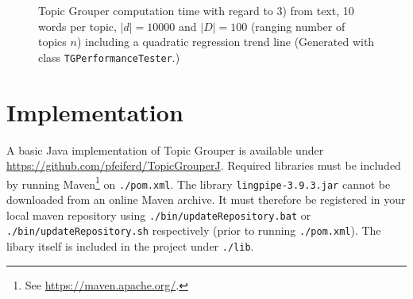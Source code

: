 \documentclass[10pt, a4paper, oneside]{article}
\begin{document}
\begin{figure}
\caption{Topic Grouper computation time with regard to 3) from text, 10 words per topic, $|d| = 10000$ and $|D| = 100$ (ranging number of topics $n$) including a quadratic regression trend line (Generated with class \texttt{TGPerformanceTester}.)}
\label{perf1}
\end{figure}

\section{Implementation}

A basic Java implementation of Topic Grouper is available under\\
\href{https://github.com/pfeiferd/TopicGrouperJ}{https://github.com/pfeiferd/TopicGrouperJ}.
Required libraries must be included by running Maven\footnote{See \href{https://maven.apache.org/}{https://maven.apache.org/}.} on \texttt{./pom.xml}. The library \texttt{lingpipe-3.9.3.jar} cannot be downloaded from an online Maven archive. It must therefore be registered in your local maven repository using \texttt{./bin/updateRepository.bat} or \texttt{./bin/updateRepository.sh} respectively (prior to running \texttt{./pom.xml}).
The libary itself is included in the project under \texttt{./lib}.
\end{document}
